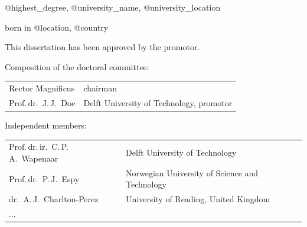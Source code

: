 \begin{titlepage}
\begin{center}
\medskip

@highest\_degree, @university\_name, @university\_location

born in @location, @country

\vspace*{2\bigskipamount}

\end{center}

\clearpage
\thispagestyle{empty}

\noindent This dissertation has been approved by the promotor.



\bigskip
\noindent Composition of the doctoral committee:

\smallskip\noindent
\begin{tabular}{p{5cm}l}
    Rector Magnificus & chairman \\
    Prof.\,dr.\  J.\,J.\ Doe & Delft University of Technology, promotor\\
\end{tabular}

\bigskip
\noindent Independent members:

\smallskip\noindent
\begin{tabular}{p{5cm}l}
    Prof.\,dr.\,ir.\ C.\,P.\,A.\ Wapenaar & Delft University of Technology \\
    Prof.\,dr.\ P.\,J.\ Espy & Norwegian University of Science and Technology \\
    dr.\ A.\,J.\ Charlton-Perez & University of Reading, United Kingdom \\
    ...
\end{tabular}



\end{titlepage}
